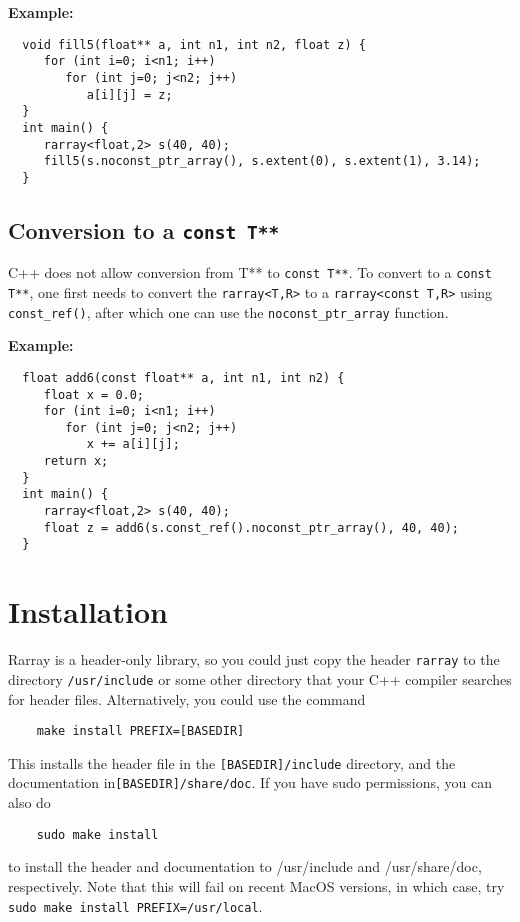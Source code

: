 \documentclass[11pt,twoside]{article}
\begin{document}
\noindent
{\bf Example:}
\vspace{-5pt}\begin{framed}\vspace{-14pt}%
\begin{verbatim}
  void fill5(float** a, int n1, int n2, float z) {
     for (int i=0; i<n1; i++)
        for (int j=0; j<n2; j++)
           a[i][j] = z;
  }
  int main() {
     rarray<float,2> s(40, 40);
     fill5(s.noconst_ptr_array(), s.extent(0), s.extent(1), 3.14);
  }
\end{verbatim}%
\vspace{-14pt}
\end{framed}

\subsection{Conversion to a {\tt const T**}}
\noindent
C++ does not allow conversion from T** to \texttt{const T**}. To convert to a \texttt{const T**}, one first needs to convert the \texttt{rarray{\tt<}T,R{\tt>}} to a \texttt{rarray{\tt<}const T,R{\tt>}} using \texttt{const\_ref()}, after which one can use the \texttt{noconst\_ptr\_array} function.

\noindent
{\bf Example:}
\vspace{-5pt}\begin{framed}\vspace{-14pt}%
\begin{verbatim}
  float add6(const float** a, int n1, int n2) {
     float x = 0.0;
     for (int i=0; i<n1; i++)
        for (int j=0; j<n2; j++)
           x += a[i][j];
     return x;
  }
  int main() {
     rarray<float,2> s(40, 40);
     float z = add6(s.const_ref().noconst_ptr_array(), 40, 40);
  }
\end{verbatim}%
\vspace{-14pt} 
\end{framed}

\pagebreak
\appendix

\section{Installation}

Rarray is a header-only library, so you could just copy the header \texttt{rarray} to the directory \texttt{/usr/include} or some other directory
that your C++ compiler searches for header files.  Alternatively, you could use the command
\begin{verbatim}
    make install PREFIX=[BASEDIR]
\end{verbatim}
This installs the header file in the \texttt{[BASEDIR]/include} directory,
and the documentation in\linebreak \texttt{[BASEDIR]/share/doc}.
If you have sudo permissions, you can also do
\begin{verbatim}
    sudo make install
\end{verbatim}
to install the header and documentation to /usr/include and /usr/share/doc,
respectively. Note that this will fail on recent MacOS versions,
in which case, try \texttt{sudo make install PREFIX=/usr/local}.
\end{document}
